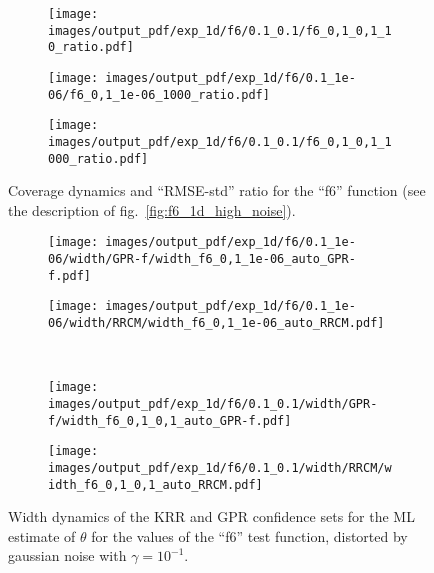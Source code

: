 \documentclass[a4paper,14pt]{extarticle}
\begin{document}
\begin{figure}
  \begin{subfigure}[b]{0.25\linewidth}
    \texttt{[image: images/output\_pdf/exp\_1d/f6/0.1\_0.1/f6\_0,1\_0,1\_10\_ratio.pdf]}
    \caption{} \label{fig:f6_1d_high_noise_arb_c2}
  \end{subfigure}%
  \begin{subfigure}[b]{0.25\linewidth}
    \texttt{[image: images/output\_pdf/exp\_1d/f6/0.1\_1e-06/f6\_0,1\_1e-06\_1000\_ratio.pdf]}
    \caption{} \label{fig:f6_1d_high_noise_arb_c3}
  \end{subfigure}%
  \begin{subfigure}[b]{0.25\linewidth}
    \texttt{[image: images/output\_pdf/exp\_1d/f6/0.1\_0.1/f6\_0,1\_0,1\_1000\_ratio.pdf]}
    \caption{} \label{fig:f6_1d_high_noise_arb_c4}
  \end{subfigure}%
  \caption{Coverage dynamics and ``RMSE-std'' ratio for the ``f6'' function (see
  the description of fig.~\ref{fig:f6_1d_high_noise}).}
  \label{fig:f6_1d_high_noise_arb}
\end{figure}

\begin{figure}%
  \centering
  \begin{subfigure}[b]{0.25\linewidth}
    \texttt{[image: images/output\_pdf/exp\_1d/f6/0.1\_1e-06/width/GPR-f/width\_f6\_0,1\_1e-06\_auto\_GPR-f.pdf]}
  \end{subfigure}%
  \begin{subfigure}[b]{0.25\linewidth}
    \texttt{[image: images/output\_pdf/exp\_1d/f6/0.1\_1e-06/width/RRCM/width\_f6\_0,1\_1e-06\_auto\_RRCM.pdf]}
  \end{subfigure}\\
  \begin{subfigure}[b]{0.25\linewidth}
    \texttt{[image: images/output\_pdf/exp\_1d/f6/0.1\_0.1/width/GPR-f/width\_f6\_0,1\_0,1\_auto\_GPR-f.pdf]}
    \caption{} \label{fig:f6_1d_high_noise_width_c1}
  \end{subfigure}%
  \begin{subfigure}[b]{0.25\linewidth}
    \texttt{[image: images/output\_pdf/exp\_1d/f6/0.1\_0.1/width/RRCM/width\_f6\_0,1\_0,1\_auto\_RRCM.pdf]}
    \caption{} \label{fig:f6_1d_high_noise_width_c2}
  \end{subfigure}
  \caption{Width dynamics of the KRR and GPR confidence sets for the ML estimate
  of $\theta$ for the values of the ``f6'' test function, distorted by gaussian noise
  with $\gamma=10^{-1}$.}
  \label{fig:f6_1d_high_noise_width}
\end{figure}
\end{document}
